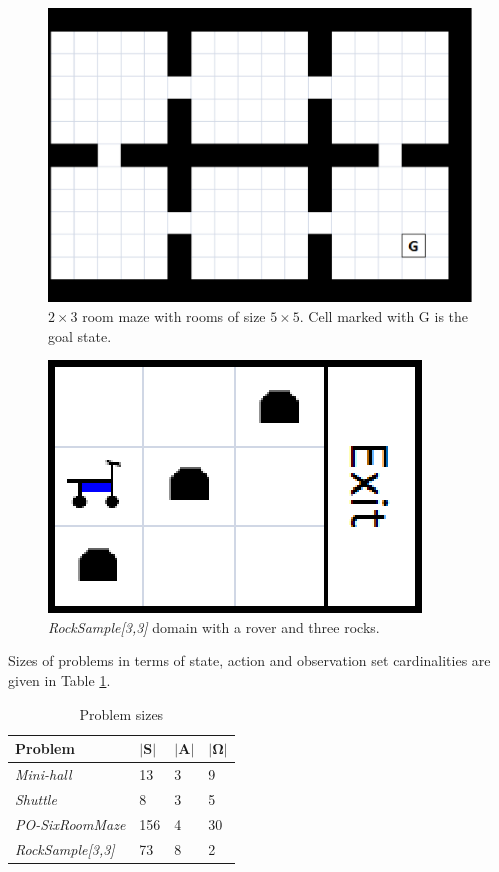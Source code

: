\documentclass[10pt, conference, compsocconf]{IEEEtran}
\begin{document}
\begin{figure}[t]
\centering
\includegraphics[scale=0.3]{problem-room-maze}
\caption{$2 \times 3$ room maze with rooms of size $5 \times 5$. Cell marked with G is the goal state.}
\label{fig:problem-room-maze}
\end{figure}

\begin{figure}[t]
\centering
\includegraphics[scale=0.6]{problem-rock-sample3x3}
\caption{\textit{RockSample[3,3]} domain with a rover and three rocks.}
\label{fig:problem-rock-sample3x3}
\end{figure}

Sizes of problems in terms of state, action and observation set cardinalities are given in Table \ref{tab:problem_sizes}. 

\begin{table}[t]
\centering
	\caption{Problem sizes}
	\label{tab:problem_sizes}
	\begin{tabular}{ | l | l | l | l | }
		\hline
		\textbf{Problem} & $\mathbf{|S|}$ & $\mathbf{|A|}$ & $\mathbf{|\Omega|}$ \\ \hline
		\textit{Mini-hall} & 13 & 3 & 9 \\ \hline
		\textit{Shuttle} & 8 & 3 & 5 \\ \hline
		\textit{PO-SixRoomMaze} & 156 & 4 & 30 \\ \hline
		\textit{RockSample[3,3]} & 73 & 8 & 2 \\ \hline
	\end{tabular}
\end{table}
\end{document}
